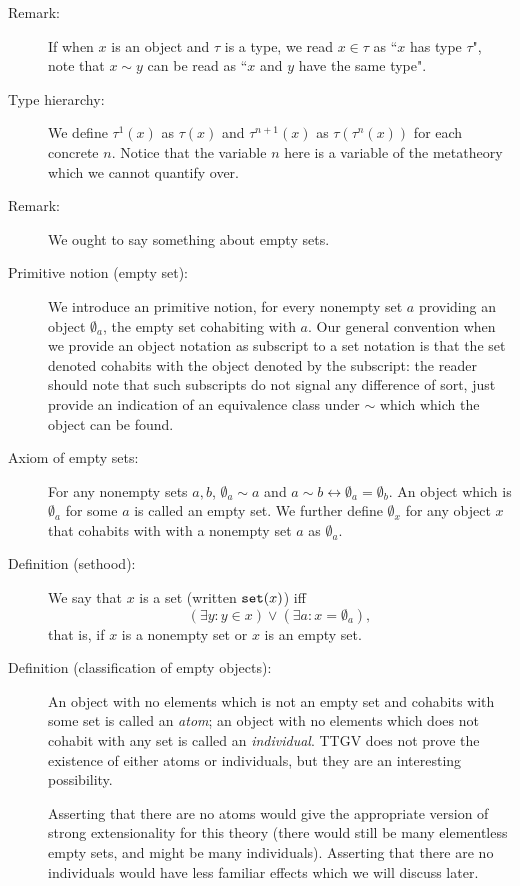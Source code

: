 \documentclass[12pt]{article}
\begin{document}
\begin{description}
\item[Remark:]  If when $x$ is an object and $\tau$ is a type, we read $x \in \tau$ as ``$x$ has type $\tau$", note that $x \sim y$ can be read as ``$x$ and $y$ have the same type".

\item[Type hierarchy:]  We define $\tau^1(x)$ as $\tau(x)$ and $\tau^{n+1}(x)$ as $\tau(\tau^n(x))$ for each concrete $n$.  Notice that the variable $n$ here is a variable of the metatheory which we cannot quantify over.

\item[Remark:]  We ought to say something about empty sets.

\item[Primitive notion (empty set):]  We introduce an primitive notion, for every nonempty set $a$ providing an object $\emptyset_{a}$, the empty set cohabiting with $a$.  Our general convention when we provide an object notation as subscript to a set notation is that the set denoted cohabits with the object denoted by the subscript:  the reader should note that such subscripts do not signal any difference of sort, just provide an indication of an equivalence class under $\sim$ which which the object can be found.

\item[Axiom of empty sets:]  For any nonempty sets $a,b$, $\emptyset_a \sim a$ and $a \sim b \leftrightarrow \emptyset_a = \emptyset_b$.  An object which is $\emptyset_a$ for some $a$ is called an empty set.  We further define $\emptyset_x$ for any object $x$ that cohabits with with a nonempty set $a$ as $\emptyset_a$.

\item[Definition (sethood):]  We say that $x$ is a set (written ${\tt set}(x)$) iff $$(\exists y:y \in x) \vee (\exists a:x = \emptyset_{a}), $$  that is, if $x$ is a nonempty set or $x$ is an empty set.

\item[Definition (classification of empty objects):]  An object with no elements which is not an empty set and cohabits with some set is called an {\em atom\/};  an object with no elements which does not cohabit with any set is called an {\em individual\/}.   TTGV does not prove the existence of either atoms or individuals, but they are an interesting possibility.

Asserting that there are no atoms would give the appropriate version of strong extensionality for this theory (there would still be many elementless empty sets, and might be many individuals).  Asserting that there are no individuals would have less familiar effects which we will discuss later.


\end{description}
\end{document}
